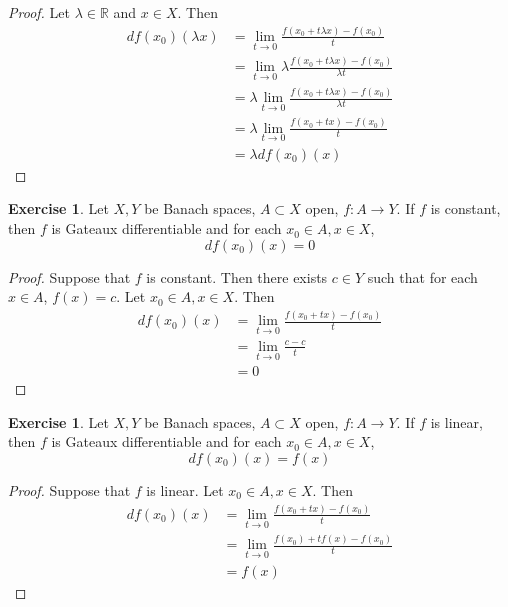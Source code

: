 \documentclass[12pt]{amsart}
\theoremstyle{definition}
\newtheorem{ex}[definition]{Exercise}
\newcommand{\lam}{\lambda}
\newcommand{\R}{\mathbb{R}}
\newcommand{\lex}[1]{\label{ex:#1}}
\begin{document}
	\begin{proof}
	Let $\lam \in \R$ and $x \in X$. Then 
	\begin{align*}
	df(x_0)(\lam x) 
	&= \lim_{t \rightarrow 0} \frac{f(x_0 + t \lam x) - f(x_0)}{t} \\
	&= \lim_{t \rightarrow 0} \lam \frac{f(x_0 + t \lam x) - f(x_0)}{\lam t} \\
	&= \lam \lim_{t \rightarrow 0}  \frac{f(x_0 + t \lam x) - f(x_0)}{\lam t} \\
	&= \lam \lim_{t \rightarrow 0}  \frac{f(x_0 + t x) - f(x_0)}{t} \\
	&= \lam df(x_0)(x) 
	\end{align*}
	\end{proof}
	
	\begin{ex} \lex{61006}
	Let $X, Y$ be Banach spaces, $A \subset X$ open, $f:A \rightarrow Y$. If $f$ is constant, then $f$ is Gateaux differentiable and for each $x_0\in A, x \in X$, $$df(x_0)(x) = 0$$
	\end{ex}
	
	\begin{proof}
	Suppose that $f$ is constant. Then there exists $c \in Y$ such that for each $x \in A$, $f(x) = c$. Let $x_0 \in A, x \in X$. Then 
	\begin{align*}
	df(x_0)(x) 
	&= \lim_{t \rightarrow 0} \frac{f(x_0 + t x) - f(x_0)}{t} \\
	&= \lim_{t \rightarrow 0} \frac{c - c}{t} \\
	&= 0
	\end{align*}
	\end{proof}
	
	\begin{ex} \lex{61007}
	Let $X, Y$ be Banach spaces, $A \subset X$ open, $f:A \rightarrow Y$. If $f$ is linear, then $f$ is Gateaux differentiable and for each $x_0\in A, x \in X$, $$df(x_0)(x) = f(x)$$
	\end{ex}
	
	\begin{proof}
	Suppose that $f$ is linear. Let $x_0\in A, x \in X$. Then 
	\begin{align*}
	df(x_0)(x) 
	&= \lim_{t \rightarrow 0} \frac{f(x_0 + t x) - f(x_0)}{t} \\
	&= \lim_{t \rightarrow 0} \frac{f(x_0) + t f(x) - f(x_0)}{t} \\
	&= f(x)
	\end{align*}
	\end{proof}		
	
\end{document}
